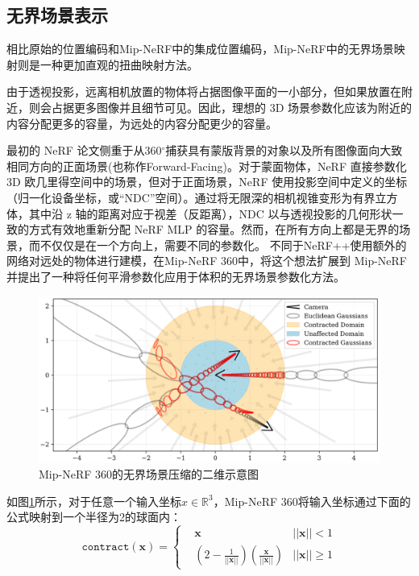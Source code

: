 \subsection{无界场景表示}
相比原始的位置编码和Mip-NeRF中的集成位置编码，Mip-NeRF中的无界场景映射则是一种更加直观的扭曲映射方法。

由于透视投影，远离相机放置的物体将占据图像平面的一小部分，但如果放置在附近，则会占据更多图像并且细节可见。因此，理想的 3D 场景参数化应该为附近的内容分配更多的容量，为远处的内容分配更少的容量。

最初的 NeRF 论文侧重于从360$^\circ$捕获具有蒙版背景的对象以及所有图像面向大致相同方向的正面场景(也称作Forward-Facing)。对于蒙面物体，NeRF 直接参数化 3D 欧几里得空间中的场景，但对于正面场景，NeRF 使用投影空间中定义的坐标（归一化设备坐标，或“NDC”空间）。通过将无限深的相机视锥变形为有界立方体，其中沿 z 轴的距离对应于视差（反距离），NDC 以与透视投影的几何形状一致的方式有效地重新分配 NeRF MLP 的容量。然而，在所有方向上都是无界的场景，而不仅仅是在一个方向上，需要不同的参数化。 不同于NeRF++\cite{zhang_nerf_2020}使用额外的网络对远处的物体进行建模，在Mip-NeRF 360\cite{barron_mip-nerf_2022}中，将这个想法扩展到 Mip-NeRF 并提出了一种将任何平滑参数化应用于体积的无界场景参数化方法。

\begin{figure}[ht]
    \centering
    \includegraphics[width=\textwidth]{undergraduate-thesis/images/mipnerf360-contraction.png}
    \caption{Mip-NeRF 360\cite{barron_mip-nerf_2022}的无界场景压缩的二维示意图}
    \label{fig:related-work-unbounded-contraction}
\end{figure}

如图\ref{fig:related-work-unbounded-contraction}所示，对于任意一个输入坐标$x\in\mathbb{R}^3$，Mip-NeRF 360将输入坐标通过下面的公式映射到一个半径为2的球面内：
\begin{equation}
    \mathtt{contract}(\mathbf{x}) = \left\{\begin{matrix}&\mathbf{x}&||\mathbf{x}||<1\\&(2-\frac{1}{||\mathbf{x}||})(\frac{\mathbf{x}}{||\mathbf{x}||})&||\mathbf{x}||\geq1\end{matrix}\right.
\end{equation}

